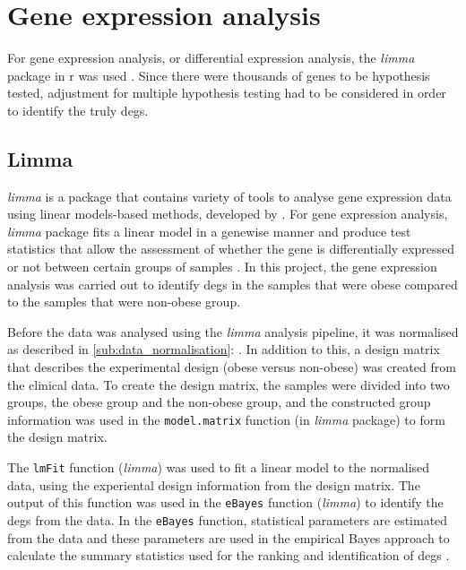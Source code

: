 \section{Gene expression analysis}
\label{sec:gene_expression_analysis}

For gene expression analysis, or differential expression analysis, the \textit{limma} package in \gls{r} was used \citep{Ritchie2015}.
Since there were thousands of genes to be hypothesis tested, adjustment for multiple hypothesis testing had to be considered in order to identify the truly \glspl{deg}.

\subsection{Limma}
\label{sub:limma}

\textit{limma} is a package that contains variety of tools to analyse gene expression data using linear models-based methods, developed by \citet{Ritchie2015}.
For gene expression analysis, \textit{limma} package fits a linear model in a genewise manner and produce test statistics that allow the assessment of whether the gene is differentially expressed or not between certain groups of samples \citep{Ritchie2015}.
In this project, the gene expression analysis was carried out to identify \glspl{deg} in the samples that were obese compared to the samples that were non-obese group.

Before the data was analysed using the \textit{limma} analysis pipeline, it was normalised as described in \cref{sub:data_normalisation}: .
In addition to this, a design matrix that describes the experimental design (obese versus non-obese) was created from the clinical data.
To create the design matrix, the samples were divided into two groups, the obese group and the non-obese group, and the constructed group information was used in the \texttt{model.matrix} function (in \textit{limma} package) to form the design matrix.

The \texttt{lmFit} function (\textit{limma}) was used to fit a linear model to the normalised data, using the experiental design information from the design matrix.
The output of this function was used in the \texttt{eBayes} function (\textit{limma}) to identify the \glspl{deg} from the data.
In the \texttt{eBayes} function, statistical parameters are estimated from the data and these parameters are used in the empirical Bayes approach to calculate the summary statistics used for the ranking and identification of \glspl{deg} \citep{Smyth2004}.

